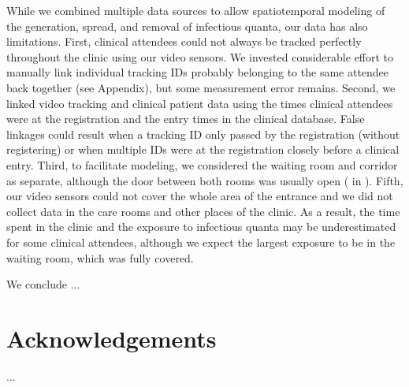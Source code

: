 \documentclass[fleqn,11pt]{wlscirep}
\begin{document}
While we combined multiple data sources to allow spatiotemporal modeling of the generation, spread, and removal of infectious quanta, our data has also limitations. First, clinical attendees could not always be tracked perfectly throughout the clinic using our video sensors. We invested considerable effort to manually link individual tracking IDs probably belonging to the same attendee back together (see Appendix), but some measurement error remains. Second, we linked video tracking and clinical patient data using the times clinical attendees were at the registration and the entry times in the clinical database. False linkages could result when a tracking ID only passed by the registration (without registering) or when multiple IDs were at the registration closely before a clinical entry. Third, to facilitate modeling, we considered the waiting room and corridor as separate, although the door between both rooms was usually open ( in \supp). Fifth, our video sensors could not cover the whole area of the entrance and we did not collect data in the care rooms and other places of the clinic. As a result, the time spent in the clinic and the exposure to infectious quanta may be underestimated for some clinical attendees, although we expect the largest exposure to be in the waiting room, which was fully covered.   

We conclude ...


\newpage


\section*{Acknowledgements}
...


\end{document}
